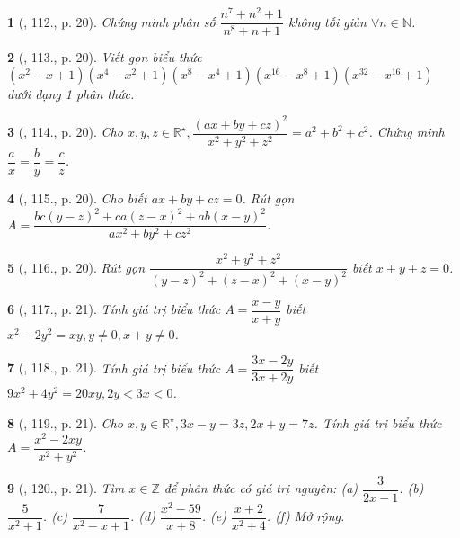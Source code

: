 \documentclass{article}
\newtheorem{baitoan}{}
\begin{document}
\begin{baitoan}[\cite{Binh_Toan_8_tap_1}, 112., p. 20]
	Chứng minh phân số $\dfrac{n^7 + n^2 + 1}{n^8 + n + 1}$ không tối giản $\forall n\in\mathbb{N}$.
\end{baitoan}

\begin{baitoan}[\cite{Binh_Toan_8_tap_1}, 113., p. 20]
	Viết gọn biểu thức $(x^2 - x + 1)(x^4 - x^2 + 1)(x^8 - x^4 + 1)(x^{16} - x^8 + 1)(x^{32} - x^{16} + 1)$ dưới dạng 1 phân thức.
\end{baitoan}

\begin{baitoan}[\cite{Binh_Toan_8_tap_1}, 114., p. 20]
	Cho $x,y,z\in\mathbb{R}^\star,\dfrac{(ax + by + cz)^2}{x^2 + y^2 + z^2} = a^2 + b^2 + c^2$. Chứng minh $\dfrac{a}{x} = \dfrac{b}{y} = \dfrac{c}{z}$.
\end{baitoan}

\begin{baitoan}[\cite{Binh_Toan_8_tap_1}, 115., p. 20]
	Cho biết $ax + by + cz = 0$. Rút gọn $A = \dfrac{bc(y - z)^2 + ca(z - x)^2 + ab(x - y)^2}{ax^2 + by^2 + cz^2}$.
\end{baitoan}

\begin{baitoan}[\cite{Binh_Toan_8_tap_1}, 116., p. 20]
	Rút gọn $\dfrac{x^2 + y^2 + z^2}{(y - z)^2 + (z - x)^2 + (x - y)^2}$ biết $x + y + z = 0$.
\end{baitoan}

\begin{baitoan}[\cite{Binh_Toan_8_tap_1}, 117., p. 21]
	Tính giá trị biểu thức $A = \dfrac{x - y}{x + y}$ biết $x^2 - 2y^2 = xy,y\ne0,x + y\ne0$.
\end{baitoan}

\begin{baitoan}[\cite{Binh_Toan_8_tap_1}, 118., p. 21]
	Tính giá trị biểu thức $A = \dfrac{3x - 2y}{3x + 2y}$ biết $9x^2 + 4y^2 = 20xy,2y < 3x < 0$.
\end{baitoan}

\begin{baitoan}[\cite{Binh_Toan_8_tap_1}, 119., p. 21]
	Cho $x,y\in\mathbb{R}^\star,3x - y = 3z,2x + y = 7z$. Tính giá trị biểu thức $A = \dfrac{x^2 - 2xy}{x^2 + y^2}$.
\end{baitoan}

\begin{baitoan}[\cite{Binh_Toan_8_tap_1}, 120., p. 21]
	Tìm $x\in\mathbb{Z}$ để phân thức có giá trị nguyên: (a) $\dfrac{3}{2x - 1}$. (b) $\dfrac{5}{x^2 + 1}$. (c) $\dfrac{7}{x^2 - x + 1}$. (d) $\dfrac{x^2 - 59}{x + 8}$. (e) $\dfrac{x + 2}{x^2 + 4}$. (f) Mở rộng.
\end{baitoan}
\end{document}
